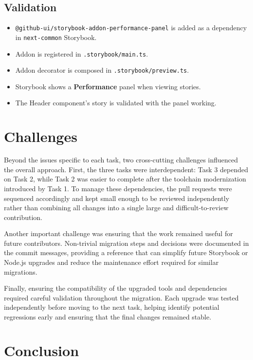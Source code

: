 \subsection{Validation}

\begin{itemize}
    \item \texttt{@github-ui/storybook-addon-performance-panel} is added as a dependency in \texttt{next-common} Storybook.
    \item Addon is registered in \texttt{.storybook/main.ts}.
    \item Addon decorator is composed in \texttt{.storybook/preview.ts}.
    \item Storybook shows a \textbf{Performance} panel when viewing stories.
    \item The Header component's story is validated with the panel working.
\end{itemize}

\section{Challenges}

Beyond the issues specific to each task, two cross-cutting challenges influenced the overall approach. First, the three tasks were interdependent: Task 3 depended on Task 2, while Task 2 was easier to complete after the toolchain modernization introduced by Task 1. To manage these dependencies, the pull requests were sequenced accordingly and kept small enough to be reviewed independently rather than combining all changes into a single large and difficult-to-review contribution.

Another important challenge was ensuring that the work remained useful for future contributors. Non-trivial migration steps and decisions were documented in the commit messages, providing a reference that can simplify future Storybook or Node.js upgrades and reduce the maintenance effort required for similar migrations.

Finally, ensuring the compatibility of the upgraded tools and dependencies required careful validation throughout the migration. Each upgrade was tested independently before moving to the next task, helping identify potential regressions early and ensuring that the final changes remained stable.

\section{Conclusion}

